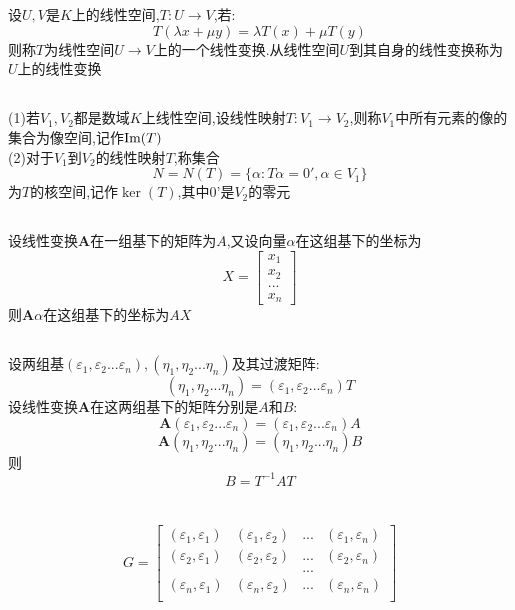 \documentclass[11pt, a4paper, UTF8]{ctexart}
\begin{document}
\section{}
\subsection{}
设$U,V$是$K$上的线性空间,$T:U\to V$,若:\\
\[T(\lambda x+\mu y)=\lambda T(x)+\mu T(y)\]
则称$T$为线性空间$U\to V$上的一个线性变换.从线性空间$U$到其自身的线性变换称为$U$上的线性变换\\
\subsection{}
(1)若$V_1,V_2$都是数域$K$上线性空间,设线性映射$T:V_1\to V_2$,则称$V_1$中所有元素的像的集合为像空间,记作$\mbox{Im}(T)$\\
(2)对于$V_1$到$V_2$的线性映射$T$,称集合
\[N=N(T)=\{\alpha:T\alpha=0',\alpha\in V_1\}\]
为$T$的核空间,记作$\ker(T)$,其中0'是$V_2$的零元\\
\subsection{}
设线性变换$\bm A$在一组基下的矩阵为$A$,又设向量$\alpha$在这组基下的坐标为
\[X=\begin{bmatrix}
x_1\\
x_2\\
...\\
x_n
\end{bmatrix}\]
则$\bm A\alpha$在这组基下的坐标为$AX$
\subsection{}
设两组基$(\varepsilon_1,\varepsilon_2...\varepsilon_n),(\eta_1,\eta_2...\eta_n)$及其过渡矩阵:
\[(\eta_1,\eta_2...\eta_n)=(\varepsilon_1,\varepsilon_2...\varepsilon_n)T\]
设线性变换$\bm A$在这两组基下的矩阵分别是$A$和$B$:
\[\bm A(\varepsilon_1,\varepsilon_2...\varepsilon_n)=(\varepsilon_1,\varepsilon_2...\varepsilon_n)A\]
\[\bm A(\eta_1,\eta_2...\eta_n)=(\eta_1,\eta_2...\eta_n)B\]
则
\[B=T^{-1}AT\]
\section{}
\[G=\begin{bmatrix}
(\varepsilon_1,\varepsilon_1)&(\varepsilon_1,\varepsilon_2)&...&(\varepsilon_1,\varepsilon_n)\\
(\varepsilon_2,\varepsilon_1)&(\varepsilon_2,\varepsilon_2)&...&(\varepsilon_2,\varepsilon_n)\\
&&...&\\
(\varepsilon_n,\varepsilon_1)&(\varepsilon_n,\varepsilon_2)&...&(\varepsilon_n,\varepsilon_n)\\
\end{bmatrix}\]
\end{document}
